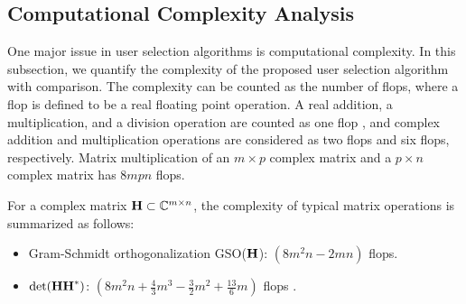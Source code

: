 \documentclass[journal,twoside]{IEEEtranTCOM}
\begin{document}
\subsection{Computational Complexity Analysis} \label{Section:Complexity}
One major issue in user selection algorithms is computational complexity. In this subsection, we quantify the complexity of the proposed user selection algorithm with comparison. The complexity can be counted as the number of flops, where a flop is defined to be a real floating point operation. A real addition, a multiplication, and a division operation are counted as one flop \cite{c_n}, and  complex addition and multiplication operations are considered as two flops and six flops, respectively. Matrix multiplication of an ${m \times p}$ complex matrix and a ${p \times n}$ complex matrix has $8mpn$ flops.

For a complex matrix ${\bf{H}} \subset {\mathbb{C}}^{m \times n}$, the complexity of typical matrix operations is summarized as follows:
\begin{itemize}
\item{Gram-Schmidt orthogonalization GSO($\bf{H}$): $(8m^2n-2mn)$ flops.}
\item{$\det({\bf{HH}}^*)$: $(8m^2n+{\frac{4}{3}m^3 - \frac{3}{2}m^2 + \frac{{13}}{6}{m}})$ flops \cite{Upperbound}.}
\end{itemize}
\end{document}
